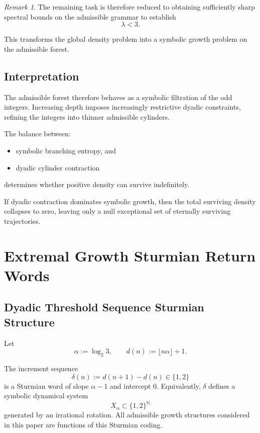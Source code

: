 \documentclass[12pt, oneside]{article}
\numberwithin{equation}{section}
\theoremstyle{definition}
\theoremstyle{plain}
\theoremstyle{remark}
\newtheorem*{remark}{Remark}
\begin{document}
\begin{remark}
The remaining task is therefore reduced to obtaining sufficiently sharp
spectral bounds on the admissible grammar to establish
\[
\lambda<3.
\]

This transforms the global density problem into a symbolic growth
problem on the admissible forest.
\end{remark}

\subsection{Interpretation}

The admissible forest therefore behaves as a symbolic filtration of the
odd integers. Increasing depth imposes increasingly restrictive dyadic
constraints, refining the integers into thinner admissible cylinders.

The balance between:
\begin{itemize}
\item symbolic branching entropy, and
\item dyadic cylinder contraction
\end{itemize}
determines whether positive density can survive indefinitely.

If dyadic contraction dominates symbolic growth, then the total
surviving density collapses to zero, leaving only a null exceptional
set of eternally surviving trajectories.

\section{Extremal Growth Sturmian Return Words}

\subsection{Dyadic Threshold Sequence Sturmian Structure}

Let
\[
\alpha := \log_2 3,
\qquad
d(n) := \lfloor n\alpha \rfloor + 1.
\]

The increment sequence
\[
\delta(n) := d(n+1) - d(n) \in \{1,2\}
\]
is a Sturmian word of slope $\alpha - 1$ and intercept $0$.
Equivalently, $\delta$ defines a symbolic dynamical system
\[
X_\alpha \subset \{1,2\}^{\mathbb{N}}
\]
generated by an irrational rotation. All admissible growth structures
considered in this paper are functions of this Sturmian coding.
\end{document}
